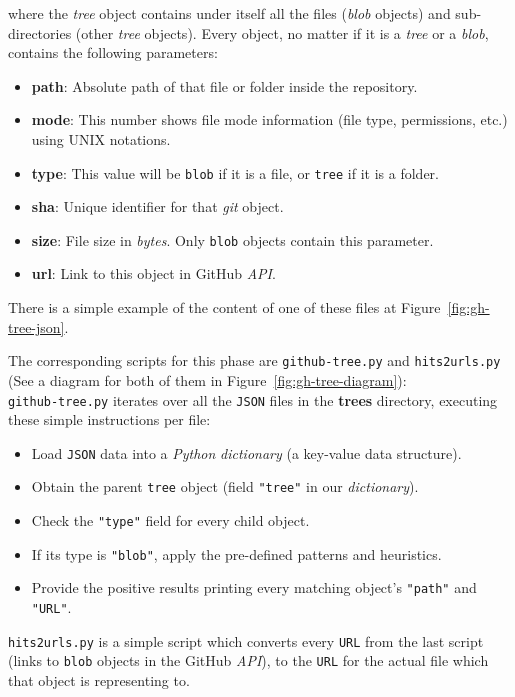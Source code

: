 \documentclass[a4paper, 12pt]{book}
\begin{document}
where the \textit{tree} object contains under itself all the files (\textit{blob} objects) and sub-directories
(other \textit{tree} objects). Every object, no matter if it is a \textit{tree} or a \textit{blob}, contains the following parameters:
\begin{itemize}
  \item \textbf{path}: Absolute path of that file or folder inside the repository.
  \item \textbf{mode}: This number shows file mode information (file type, permissions, etc.) using UNIX notations.
  \item \textbf{type}: This value will be \texttt{blob} if it is a file, or \texttt{tree} if it is a folder.
  \item \textbf{sha}: Unique identifier for that \emph{git} object.
  \item \textbf{size}: File size in \textit{bytes}. Only \texttt{blob} objects contain this parameter.
  \item \textbf{url}: Link to this object in GitHub \textit{API}.
\end{itemize}
There is a simple example of the content of one of these files at Figure~\ref{fig:gh-tree-json}.\par
The corresponding scripts for this phase are \texttt{github-tree.py} and \texttt{hits2urls.py}
(See a diagram for both of them in Figure~\ref{fig:gh-tree-diagram}):\\
\texttt{github-tree.py} iterates over all the \texttt{JSON} files in the \textbf{trees} directory,
executing these simple instructions per file:
\begin{itemize}
  \item Load \texttt{JSON} data into a \emph{Python} \textit{dictionary} (a key-value data structure).
  \item Obtain the parent \texttt{tree} object (field \texttt{"tree"} in our \textit{dictionary}).
  \item Check the \texttt{"type"} field for every child object.
  \item If its type is \texttt{"blob"}, apply the pre-defined patterns and heuristics.
  \item Provide the positive results printing every matching object's \texttt{"path"} and \texttt{"URL"}.
\end{itemize}
\texttt{hits2urls.py} is a simple script which converts every \texttt{URL} from the last script (links to \texttt{blob} objects
in the GitHub \textit{API}), to the \texttt{URL} for the actual file which that object is representing to.
\end{document}
